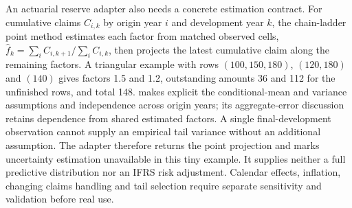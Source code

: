\enlargethispage{\baselineskip}
An actuarial reserve adapter also needs a concrete estimation contract.
For cumulative claims $C_{i,k}$ by origin year $i$ and development year $k$,
the chain-ladder point method estimates each factor from matched observed
cells, $\widehat f_k=\sum_i C_{i,k+1}/\sum_i C_{i,k}$, then projects the
latest cumulative claim along the remaining factors. A triangular example
with rows $(100,150,180)$, $(120,180)$ and $(140)$ gives factors 1.5 and
1.2, outstanding amounts 36 and 112 for the unfinished rows, and total 148.
\citet[Sections 2--3, equations (1)--(3)]{mack1993} makes explicit the
conditional-mean and variance assumptions and independence across origin
years; its aggregate-error discussion retains dependence from shared estimated
factors. A single final-development observation cannot supply an empirical
tail variance without an additional assumption. The adapter therefore returns
the point projection and marks uncertainty estimation unavailable in this tiny
example. It supplies neither a full predictive distribution nor an IFRS risk
adjustment. Calendar effects, inflation, changing claims handling and tail
selection require separate sensitivity and validation before real use.
